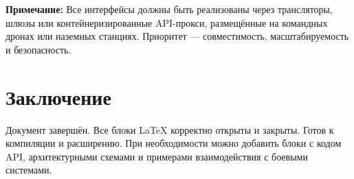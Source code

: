 \documentclass{article}
\begin{document}
\textbf{Примечание:} Все интерфейсы должны быть реализованы через трансляторы, шлюзы или контейнеризированные API-прокси, размещённые на командных дронах или наземных станциях. Приоритет — совместимость, масштабируемость и безопасность.

\section*{Заключение}

Документ завершён. Все блоки LaTeX корректно открыты и закрыты. Готов к компиляции и расширению. При необходимости можно добавить блоки с кодом API, архитектурными схемами и примерами взаимодействия с боевыми системами.
\end{document}
